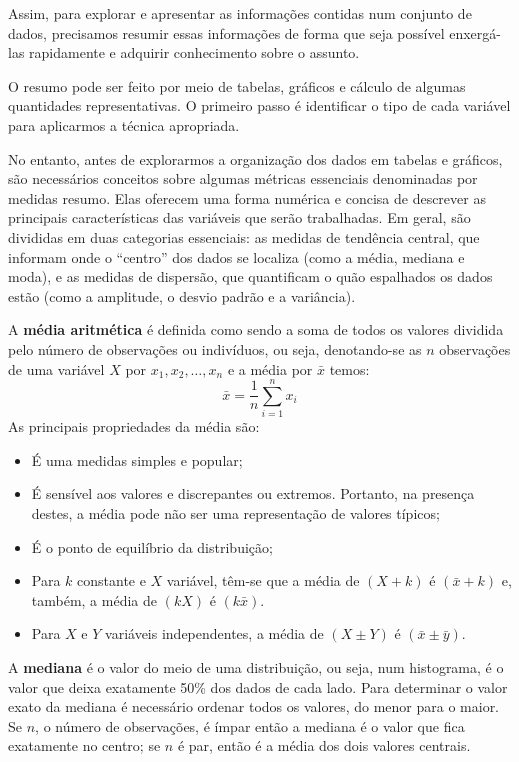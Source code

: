 \documentclass[
  12pt,
  letterpaper,
  DIV=11,
  numbers=noendperiod]{scrreprt}
\providecommand{\tightlist}{%
  \setlength{\itemsep}{0pt}\setlength{\parskip}{0pt}}\usepackage{longtable,booktabs,array}
\theoremstyle{definition}
\theoremstyle{exemplo}
\begin{document}
Assim, para explorar e apresentar as informações contidas num conjunto
de dados, precisamos resumir essas informações de forma que seja
possível enxergá-las rapidamente e adquirir conhecimento sobre o
assunto.

O resumo pode ser feito por meio de tabelas, gráficos e cálculo de
algumas quantidades representativas. O primeiro passo é identificar o
tipo de cada variável para aplicarmos a técnica apropriada.

No entanto, antes de explorarmos a organização dos dados em tabelas e
gráficos, são necessários conceitos sobre algumas métricas essenciais
denominadas por medidas resumo. Elas oferecem uma forma numérica e
concisa de descrever as principais características das variáveis que
serão trabalhadas. Em geral, são divididas em duas categorias
essenciais: as medidas de tendência central, que informam onde o
``centro'' dos dados se localiza (como a média, mediana e moda), e as
medidas de dispersão, que quantificam o quão espalhados os dados estão
(como a amplitude, o desvio padrão e a variância).

A \textbf{média aritmética} é definida como sendo a soma de todos os
valores dividida pelo número de observações ou indivíduos, ou seja,
denotando-se as \(n\) observações de uma variável \(X\) por
\(x_1, x_2, \dots, x_n\) e a média por \(\bar{x}\) temos:
\[\bar{x} = \frac{1}{n}\sum_{i = 1}^{n} x_i\] As principais propriedades
da média são:

\begin{itemize}
\tightlist
\item
  É uma medidas simples e popular;
\item
  É sensível aos valores e discrepantes ou extremos. Portanto, na
  presença destes, a média pode não ser uma representação de valores
  típicos;
\item
  É o ponto de equilíbrio da distribuição;
\item
  Para \(k\) constante e \(X\) variável, têm-se que a média de
  \((X + k)\) é \((\bar{x} + k)\) e, também, a média de \((kX)\) é
  \((k\bar{x})\).
\item
  Para \(X\) e \(Y\) variáveis independentes, a média de \((X\pm Y)\) é
  \((\bar{x} \pm \bar{y})\).
\end{itemize}

A \textbf{mediana} é o valor do meio de uma distribuição, ou seja, num
histograma, é o valor que deixa exatamente 50\% dos dados de cada lado.
Para determinar o valor exato da mediana é necessário ordenar todos os
valores, do menor para o maior. Se \(n\), o número de observações, é
ímpar então a mediana é o valor que fica exatamente no centro; se \(n\)
é par, então é a média dos dois valores centrais.
\end{document}
